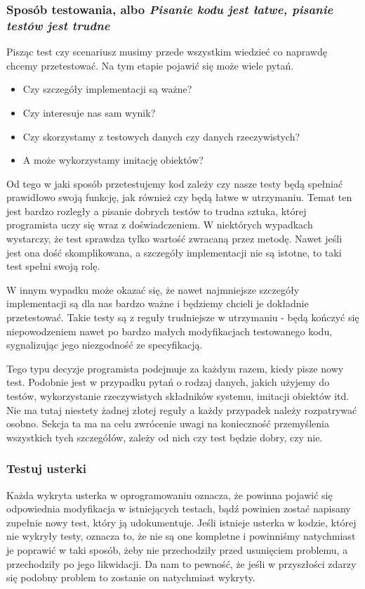   \subsubsection{Sposób testowania, albo \emph{Pisanie kodu jest łatwe, pisanie testów jest trudne}}
  Pisząc test czy scenariusz musimy przede wszystkim wiedzieć co naprawdę chcemy przetestować. Na tym etapie pojawić się może wiele pytań.
  \begin{itemize}
    \item Czy szczegóły implementacji są ważne? 
    \item Czy interesuje nas sam wynik? 
    \item Czy skorzystamy z testowych danych czy danych rzeczywistych? 
    \item A może wykorzystamy imitację obiektów?
  \end{itemize}
  
  Od tego w jaki sposób przetestujemy kod zależy czy nasze testy będą spełniać prawidłowo swoją funkcję, jak również czy będą łatwe w utrzymaniu. Temat ten jest bardzo rozległy a pisanie dobrych testów to trudna sztuka, której programista uczy się wraz z doświadczeniem. W niektórych wypadkach wystarczy, że test sprawdza tylko wartość zwracaną przez metodę. Nawet jeśli jest ona dość skomplikowana, a szczegóły implementacji nie są istotne, to taki test spełni swoją rolę. 
  
  W innym wypadku może okazać się, że nawet najmniejsze szczegóły implementacji są dla nas bardzo ważne i będziemy chcieli je dokładnie przetestować. Takie testy są z reguły trudniejsze w utrzymaniu - będą kończyć się niepowodzeniem nawet po bardzo małych modyfikacjach testowanego kodu, sygnalizując jego niezgodność ze specyfikacją.
  
  Tego typu decyzje programista podejmuje za każdym razem, kiedy pisze nowy test. Podobnie jest w przypadku pytań o rodzaj danych, jakich użyjemy do testów, wykorzystanie rzeczywistych składników systemu, imitacji obiektów itd. Nie ma tutaj niestety żadnej złotej reguły a każdy przypadek należy rozpatrywać osobno. Sekcja ta ma na celu zwrócenie uwagi na konieczność przemyślenia wszystkich tych szczegółów, zależy od nich czy test będzie dobry, czy nie.
  
  \subsubsection{Testuj usterki}
  Każda wykryta usterka w oprogramowaniu oznacza, że powinna pojawić się odpowiednia modyfikacja w istniejących testach, bądź powinien zostać napisany zupełnie nowy test, który ją udokumentuje. Jeśli istnieje usterka w kodzie, której nie wykryły testy, oznacza to, że nie są one kompletne i powinniśmy natychmiast je poprawić w taki sposób, żeby nie przechodziły przed usunięciem problemu, a przechodziły po jego likwidacji. Da nam to pewność, że jeśli w przyszłości zdarzy się podobny problem to zostanie on natychmiast wykryty.
  
